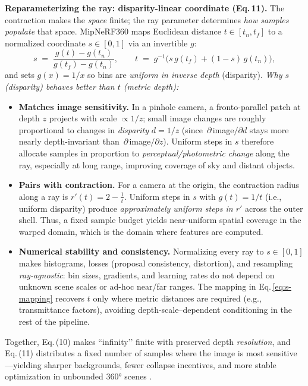 \begin{enrichment}
\begin{enrichment}
        \textbf{Reparameterizing the ray: disparity-linear coordinate (Eq.\,11).} The contraction makes the \emph{space} finite; the ray parameter determines \emph{how samples populate} that space. MipNeRF360 maps Euclidean distance $t\!\in[t_n,t_f]$ to a normalized coordinate $s\!\in[0,1]$ via an invertible $g$:
        \begin{equation}
            s \;=\; \frac{g(t)-g(t_n)}{g(t_f)-g(t_n)},\qquad
            t \;=\; g^{-1}\!\big(s\,g(t_f)+(1-s)\,g(t_n)\big),
            \label{eq:s-mapping}
        \end{equation}
        and sets $g(x)=1/x$ so bins are \emph{uniform in inverse depth} (disparity). \emph{Why $s$ (disparity) behaves better than $t$ (metric depth):}
        \begin{itemize}
            \item \textbf{Matches image sensitivity.} In a pinhole camera, a fronto-parallel patch at depth $z$ projects with scale $\propto 1/z$; small image changes are roughly proportional to changes in \emph{disparity} $d=1/z$ (since $\,\partial\,$image$/\partial d$ stays more nearly depth-invariant than $\,\partial\,$image$/\partial z$). Uniform steps in $s$ therefore allocate samples in proportion to \emph{perceptual/photometric change} along the ray, especially at long range, improving coverage of sky and distant objects.
            \item \textbf{Pairs with contraction.} For a camera at the origin, the contraction radius along a ray is $r'(t)=2-\tfrac{1}{t}$. Uniform steps in $s$ with $g(t)=1/t$ (i.e., uniform disparity) produce \emph{approximately uniform steps in $r'$} across the outer shell. Thus, a fixed sample budget yields near-uniform spatial coverage in the warped domain, which is the domain where features are computed.
            \item \textbf{Numerical stability and consistency.} Normalizing every ray to $s\!\in[0,1]$ makes histograms, losses (proposal consistency, distortion), and resampling \emph{ray-agnostic}: bin sizes, gradients, and learning rates do not depend on unknown scene scales or ad-hoc near/far ranges. The mapping in Eq.\,\eqref{eq:s-mapping} recovers $t$ only where metric distances are required (e.g., transmittance factors), avoiding depth-scale–dependent conditioning in the rest of the pipeline.
        \end{itemize}
        Together, Eq.\,(10) makes “infinity’’ finite with preserved depth \emph{resolution}, and Eq.\,(11) distributes a fixed number of samples where the image is most sensitive—yielding sharper backgrounds, fewer collapse incentives, and more stable optimization in unbounded 360° scenes \cite{barron2022_mipnerf360}.
        

\end{enrichment}
\end{enrichment}
